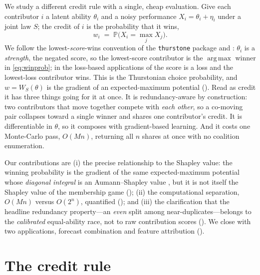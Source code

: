 \documentclass[11pt]{article}
\newcommand{\Prob}{\mathbb{P}}
\DeclareMathOperator*{\argmaxop}{arg\,max}
\begin{document}
We study a different credit rule with a single, cheap evaluation. Give each
contributor $i$ a latent ability $\theta_i$ and a noisy performance
$X_i = \theta_i + \eta_i$ under a joint law $S$; the credit of $i$ is the
probability that it wins,
\begin{equation}
  w_i \;=\; \Prob\!\Big( X_i = \max_j X_j \Big).
  \label{eq:winprob}
\end{equation}
We follow the lowest-\emph{score}-wins convention of the \texttt{thurstone} package
and \textcite{cotton2021}: $\theta_i$ is a \emph{strength}, the negated score, so the
lowest-score contributor is the $\argmaxop$ winner in \eqref{eq:winprob}; in the
loss-based applications of  the score is a loss and the lowest-loss
contributor wins. This is the Thurstonian choice probability, and $w = W_S(\theta)$
is the gradient of an expected-maximum potential (). Read as credit it has
three things going for it at once. It is redundancy-aware by construction: two
contributors that move together compete with \emph{each other}, so a co-moving pair
collapses toward a single winner and shares one contributor's credit. It is
differentiable in $\theta$, so it composes with gradient-based learning. And it
costs one Monte-Carlo pass, $O(Mn)$, returning all $n$ shares at once with no
coalition enumeration.

Our contributions are (i) the precise relationship to the Shapley value: the
winning probability is the gradient of the same expected-maximum potential whose
\emph{diagonal integral} is an Aumann--Shapley value
\parencite{owen1972, aumannshapley1974}, but it is not itself the Shapley value of
the membership game (); (ii) the computational separation,
$O(Mn)$ versus $O(2^n)$, quantified (); and (iii) the
clarification that the headline redundancy property---an \emph{even} split among
near-duplicates---belongs to the \emph{calibrated} equal-ability race, not to raw
contribution scores (). We close with two applications,
forecast combination and feature attribution ().

\section{The credit rule}
\label{sec:rule}
\end{document}
